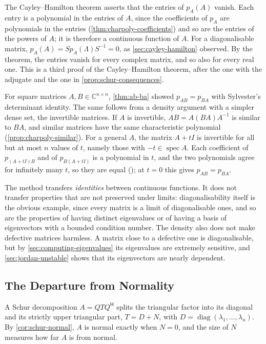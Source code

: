 The Cayley--Hamilton theorem asserts that the entries of $p_A(A)$ vanish. Each entry is a polynomial in the entries of $A$, since the coefficients of $p_A$ are polynomials in the entries (\cref{thm:charpoly-coefficients}) and so are the entries of the powers of $A$; it is therefore a continuous function of $A$. For a diagonalisable matrix, $p_A(A)=Sp_A(\Lambda)S^{-1}=0$, as \cref{sec:cayley-hamilton} observed. By the theorem, the entries vanish for every complex matrix, and so also for every real one. This is a third proof of the Cayley--Hamilton theorem, after the one with the adjugate and the one in \cref{prop:schur-consequences}.

For square matrices $A,B\in\mathbb C^{n\times n}$, \cref{thm:ab-ba} showed $p_{AB}=p_{BA}$ with Sylvester's determinant identity. The same follows from a density argument with a simpler dense set, the invertible matrices. If $A$ is invertible, $AB=A(BA)A^{-1}$ is similar to $BA$, and similar matrices have the same characteristic polynomial (\cref{prop:charpoly-similar}). For a general $A$, the matrix $A+tI$ is invertible for all but at most $n$ values of $t$, namely those with $-t\in\operatorname{spec}A$. Each coefficient of $p_{(A+tI)B}$ and of $p_{B(A+tI)}$ is a polynomial in $t$, and the two polynomials agree for infinitely many $t$, so they are equal (); at $t=0$ this gives $p_{AB}=p_{BA}$.

The method transfers \emph{identities} between continuous functions. It does not transfer properties that are not preserved under limits: diagonalisability itself is the obvious example, since every matrix is a limit of diagonalisable ones, and so are the properties of having distinct eigenvalues or of having a basis of eigenvectors with a bounded condition number. The density also does not make defective matrices harmless. A matrix close to a defective one is diagonalisable, but by \cref{sec:computing-eigenvalues} its eigenvalues are extremely sensitive, and \cref{sec:jordan-unstable} shows that its eigenvectors are nearly dependent.

\subsection{The Departure from Normality}

A Schur decomposition $A=QTQ^{\mathsf H}$ splits the triangular factor into its diagonal and its strictly upper triangular part, $T=D+N$, with $D=\operatorname{diag}(\lambda_1,\ldots,\lambda_n)$. By \cref{cor:schur-normal}, $A$ is normal exactly when $N=0$, and the size of $N$ measures how far $A$ is from normal.

